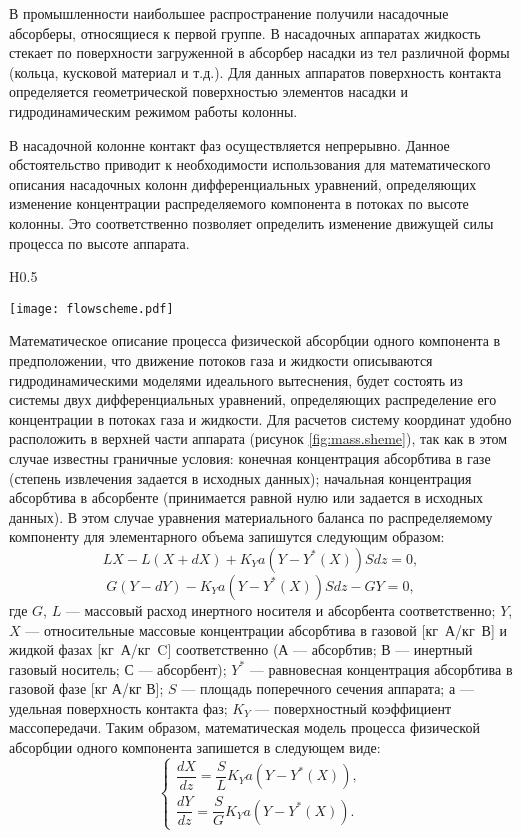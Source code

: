 В промышленности наибольшее распространение получили насадочные абсорберы, относящиеся к первой группе. В насадочных аппаратах жидкость стекает по поверхности загруженной в абсорбер насадки из тел различной формы (кольца, кусковой материал и т.д.). Для данных аппаратов поверхность контакта определяется геометрической поверхностью элементов насадки и гидродинамическим режимом работы колонны.

В насадочной колонне контакт фаз осуществляется непрерывно. Данное обстоятельство приводит к необходимости использования для математического описания насадочных колонн дифференциальных уравнений, определяющих изменение концентрации распределяемого компонента в потоках по высоте колонны. Это соответственно позволяет определить изменение движущей силы процесса по высоте аппарата.
\begin{wrapfigure}{H}{0.5\textwidth}
	\begin{center}
		\texttt{[image: flowscheme.pdf]}
	\end{center}
	\caption{ Схема проведения процесса абсорбции (противоточная)} \label{fig:mass.sheme}
\end{wrapfigure}

Математическое описание процесса физической абсорбции одного компонента в предположении, что движение потоков газа и жидкости описываются гидродинамическими моделями идеального вытеснения, будет состоять из системы двух дифференциальных уравнений, определяющих распределение его концентрации в потоках газа и жидкости. Для расчетов систему координат удобно расположить в верхней части аппарата (рисунок \ref{fig:mass.sheme}), так как в этом случае известны граничные условия: конечная концентрация абсорбтива в газе (степень извлечения задается в исходных данных); начальная концентрация абсорбтива в абсорбенте (принимается равной нулю или задается в исходных данных). В этом случае уравнения материального баланса по распределяемому компоненту для элементарного объема  запишутся следующим образом:
\begin{equation}
	L X - L(X +dX) + K_Y a (Y-Y^*(X))Sdz=0, 
\end{equation}
\begin{equation}
	G(Y-dY)-K_Y a (Y-Y^*(X))Sdz- GY=0,
\end{equation}
где $G$, $L$ --- массовый расход инертного носителя и абсорбента соответственно; $Y$, $X$ --- относительные массовые концентрации абсорбтива в газовой [кг А/кг В] и жидкой фазах [кг А/кг C] соответственно (А --- абсорбтив; В --- инертный газовый носитель; С --- абсорбент); $Y^*$ --- равновесная концентрация абсорбтива в газовой фазе [кг А/кг В]; $S$ --- площадь поперечного сечения аппарата; $а$ --- удельная поверхность контакта фаз; $K_Y$ --- поверхностный коэффициент массопередачи. Таким образом, математическая модель процесса физической абсорбции одного компонента запишется в следующем виде:
\begin{equation}
\left\lbrace 
\begin{gathered} 
\dfrac{dX}{dz}=\dfrac{S}{L} K_Y a (Y-Y^*(X)),
\\
\dfrac{dY}{dz}=\dfrac{S}{G} K_Y a (Y-Y^*(X)).
\end{gathered} 
\right.
\end{equation}

